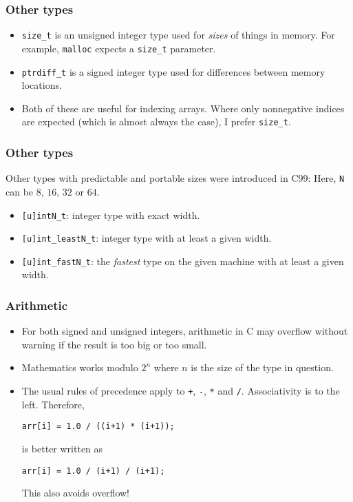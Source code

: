 \begin{frame}
  \frametitle{Other types}
  \begin{itemize}
  \item \texttt{size\_t} is an unsigned integer type used for \emph{sizes} of
    things in memory. For example, \texttt{malloc} expects a \texttt{size\_t}
    parameter.
  \item \texttt{ptrdiff\_t} is a signed integer type used for differences
    between memory locations.
  \item Both of these are useful for indexing arrays. Where only nonnegative
    indices are expected (which is almost always the case), I prefer
    \texttt{size\_t}.
  \end{itemize}
\end{frame}

\begin{frame}
  \frametitle{Other types}
  Other types with predictable and portable sizes were introduced in C99: Here,
  \texttt{N} can be $8$, $16$, $32$ or $64$.
  \begin{itemize}
  \item \texttt{[u]intN\_t}: integer type with exact width.
  \item \texttt{[u]int\_leastN\_t}: integer type with at least a given width.
  \item \texttt{[u]int\_fastN\_t}: the \emph{fastest} type on the given machine
    with at least a given width.
  \end{itemize}
\end{frame}

\begin{frame}[fragile]
  \frametitle{Arithmetic}
  \begin{itemize}
  \item For both signed and unsigned integers, arithmetic in C may overflow
    without warning if the result is too big or too small.
  \item Mathematics works modulo $2^n$ where $n$ is the size of the type in
    question.
  \item The usual rules of precedence apply to \texttt{+}, \texttt{-},
    \texttt{*} and \texttt{/}. Associativity is to the left. Therefore,
\begin{lstlisting}[style=c]
  arr[i] = 1.0 / ((i+1) * (i+1));
\end{lstlisting}
    is better written as
\begin{lstlisting}[style=c]
  arr[i] = 1.0 / (i+1) / (i+1);
\end{lstlisting}
    This also avoids overflow!
  \end{itemize}
\end{frame}

